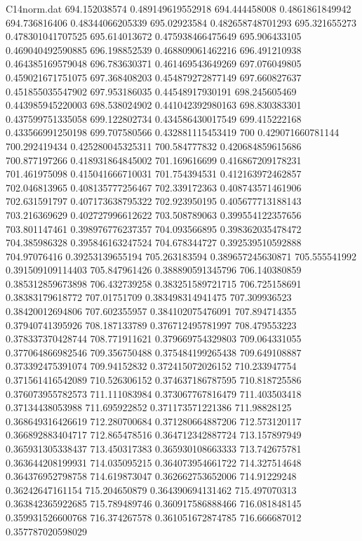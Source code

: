 \begin{filecontents}{C14norm.dat}
694.152038574			0.489149619552918
694.444458008			0.4861861849942
694.736816406			0.48344066205339
695.02923584			0.482658748701293
695.321655273			0.478301041707525
695.614013672			0.475938466475649
695.906433105			0.469040492590885
696.198852539			0.468809061462216
696.491210938			0.464385169579048
696.783630371			0.461469543649269
697.076049805			0.459021671751075
697.368408203			0.454879272877149
697.660827637			0.451855035547902
697.953186035			0.44548917930191
698.245605469			0.443985945220003
698.538024902			0.441042392980163
698.830383301			0.437599751335058
699.122802734			0.434586430017549
699.415222168			0.433566991250198
699.707580566			0.432881115453419
700			0.429071660781144
700.292419434			0.425280045325311
700.584777832			0.420684859615686
700.877197266			0.418931864845002
701.169616699			0.416867209178231
701.461975098			0.415041666710031
701.754394531			0.412163972462857
702.046813965			0.408135777256467
702.339172363			0.408743571461906
702.631591797			0.407173638795322
702.923950195			0.405677713188143
703.216369629			0.402727996612622
703.508789063			0.399554122357656
703.801147461			0.398976776237357
704.093566895			0.398362035478472
704.385986328			0.395846163247524
704.678344727			0.392539510592888
704.97076416			0.39253139655194
705.263183594			0.389657245630871
705.555541992			0.391509109114403
705.847961426			0.388890591345796
706.140380859			0.385312859673898
706.432739258			0.383251589721715
706.725158691			0.38383179618772
707.01751709			0.383498314941475
707.309936523			0.38420012694806
707.602355957			0.384102075476091
707.894714355			0.37940741395926
708.187133789			0.376712495781997
708.479553223			0.378337370428744
708.771911621			0.379669754329803
709.064331055			0.377064866982546
709.356750488			0.375484199265438
709.649108887			0.373392475391074
709.94152832			0.372415072026152
710.233947754			0.371561416542089
710.526306152			0.374637186787595
710.818725586			0.376073955782573
711.111083984			0.373067767816479
711.403503418			0.37134438053988
711.695922852			0.371173571221386
711.98828125			0.368649316426619
712.280700684			0.371280664887206
712.573120117			0.366892883404717
712.865478516			0.364712342887724
713.157897949			0.365931305338437
713.450317383			0.365930108663333
713.742675781			0.363644208199931
714.035095215			0.364073954661722
714.327514648			0.364376952798758
714.619873047			0.362662753652006
714.91229248			0.36242647161154
715.204650879			0.364390694131462
715.497070313			0.363842365922685
715.789489746			0.360917586888466
716.081848145			0.359931526600768
716.374267578			0.361051672874785
716.666687012			0.357787020598029

\end{filecontents}

